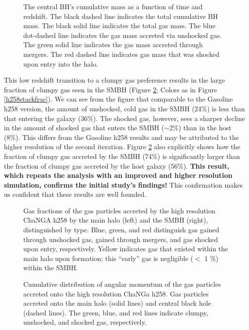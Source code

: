 \documentclass[12pt,headA,chapB]{fiskthesis}
\begin{document}
\begin{figure} [h]
\centerline{}
\caption[ChaNGa h258 SMBH Cumulative Mass]{The central BH’s cumulative mass as a function of time and redshift. The black dashed line indicates the total cumulative BH mass. The black solid line indicates the total gas mass. The blue dot-dashed line indicates the gas mass accreted via unshocked gas. The green solid line indicates the gas mass accreted through mergers. The red dashed line indicates gas mass that was shocked upon entry into the halo.}
\label{hrh258allmassgas} 
\end{figure}

This low redshift transition to a clumpy gas preference results in the large fraction of clumpy gas seen in the SMBH (Figure \ref{hrh258stackfrac}; Colors as in Figure \ref{h258stackfrac}). We can see from the figure that comparable to the Gasoline h258 version, the amount of unshocked, cold gas in the SMBH (24\%) is less than that entering the galaxy (36\%). The shocked gas, however, sees a sharper decline in the amount of shocked gas that enters the SMBH ($\sim$2\%) than in the host (8\%). This differs from the Gasoline h258 results and may be attributed to the higher resolution of the second iteration. Figure \ref{hrh258stackfrac} also explicitly shows how the fraction of clumpy gas accreted by the SMBH (74\%) is significantly larger than the fraction of clumpy gas accreted by the host galaxy (56\%).  \textbf{This result, which repeats the analysis with an improved and higher resolution simulation, confirms the initial study's findings!} This confirmation makes us confident that these results are well founded. 

\begin{figure}[h]
\centerline{}
\caption[ChaNGa h258 Galaxy and SMBH Gas Fractions at z=0]{Gas fractions of the gas particles accreted by the high resolution ChaNGA h258 by the main halo (left) and the SMBH (right), distinguished by type. Blue, green, and red distinguish gas gained through unshocked gas, gained through mergers, and gas shocked upon entry, respectively. Yellow indicates gas that existed within the main halo upon formation; this ``early'' gas is negligible ($<$ 1 \%) within the SMBH.}
\label{hrh258stackfrac} 
\end{figure}

\begin{figure}[h]
\centerline{}
\caption[ChaNGa h258 Cumulative Angular Momentum Distribution]{ Cumulative distribution of angular momentum of the gas particles accreted onto the high resolution ChaNGa h258.  Gas particles accreted onto the main halo (solid lines) and central black hole (dashed lines). The green, blue, and red lines indicate clumpy, unshocked, and shocked gas, respectively.}
\label{hrh258angmom} 
\end{figure}
\end{document}

